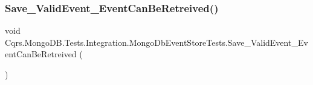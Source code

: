 \subsubsection{\texorpdfstring{Save\+\_\+\+Valid\+Event\+\_\+\+Event\+Can\+Be\+Retreived()}{Save\_ValidEvent\_EventCanBeRetreived()}}
{\footnotesize\ttfamily void Cqrs.\+Mongo\+D\+B.\+Tests.\+Integration.\+Mongo\+Db\+Event\+Store\+Tests.\+Save\+\_\+\+Valid\+Event\+\_\+\+Event\+Can\+Be\+Retreived (\begin{DoxyParamCaption}{ }\end{DoxyParamCaption})}

